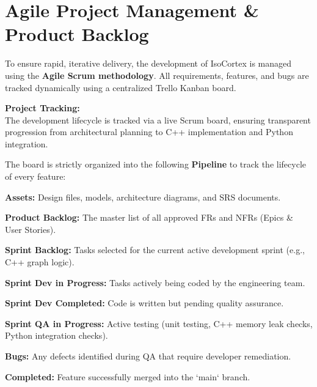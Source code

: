 \documentclass[12pt, a4paper]{article}
\begin{document}
\section{Agile Project Management \& Product Backlog}

To ensure rapid, iterative delivery, the development of IsoCortex is managed using the \textbf{Agile Scrum methodology}. All requirements, features, and bugs are tracked dynamically using a centralized Trello Kanban board.

\begin{tcolorbox}[standardbox, colback=ctLightGold, colframe=ctGold]
    \textbf{\textcolor{ctPurple}{Project Tracking:}} \\
    The development lifecycle is tracked via a live Scrum board, ensuring transparent progression from architectural planning to C++ implementation and Python integration.
\end{tcolorbox}

\noindent The board is strictly organized into the following \textbf{Pipeline} to track the lifecycle of every feature:

\vspace{0.3cm}
\begin{tcolorbox}[standardbox, colback=ctLightPurple, colframe=ctPurple]
\begin{trellolist}
    \item \textbf{Assets:} Design files, models, architecture diagrams, and SRS documents.
    \item \textbf{Product Backlog:} The master list of all approved FRs and NFRs (Epics \& User Stories).
    \item \textbf{Sprint Backlog:} Tasks selected for the current active development sprint (e.g., C++ graph logic).
    \item \textbf{Sprint Dev in Progress:} Tasks actively being coded by the engineering team.
    \item \textbf{Sprint Dev Completed:} Code is written but pending quality assurance.
    \item \textbf{Sprint QA in Progress:} Active testing (unit testing, C++ memory leak checks, Python integration checks).
    \item \textbf{Bugs:} Any defects identified during QA that require developer remediation.
    \item \textbf{Completed:} Feature successfully merged into the `main` branch.
\end{trellolist}
\end{tcolorbox}
\end{document}
